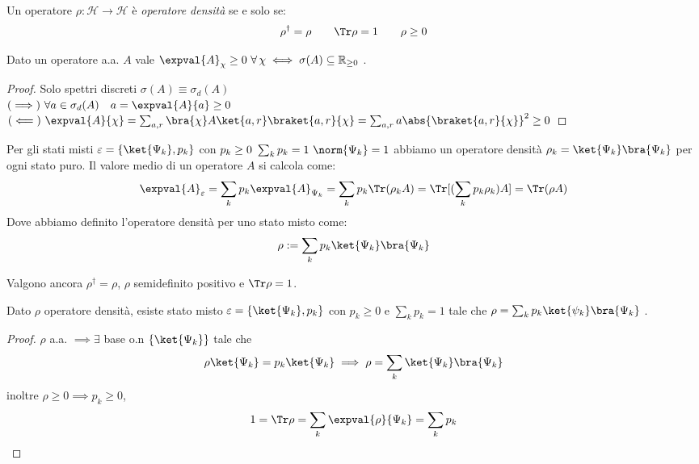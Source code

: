 \begin{definition}
    Un operatore \(\rho : \mathcal{H}\to \mathcal{H}\) è \textit{operatore densità} se e solo se:
    \begin{equation}
        \rho^\dagger = \rho \qquad \Tr \rho = 1 \qquad \rho \geq 0
    \end{equation}
\end{definition}

\begin{remark}
    Dato un operatore a.a. \(A\) vale \(\expval{A}_\chi\geq 0 \ \forall \, \chi \iff \sigma(A) \subseteq \mathbb{R}_{\geq0}\) .
\end{remark}
\begin{proof} Solo spettri discreti \(\sigma(A)\equiv \sigma_d(A)\)\\
    \((\implies) \ \forall a \in \sigma_d(A) \quad a = \expval{A}{a}\geq 0\)\\
    \((\impliedby) \ \expval{A}{\chi} = \sum_{a,r}\bra{\chi}A\ket{a,r}\braket{a,r}{\chi}= \sum_{a,r}a \abs{\braket{a,r}{\chi}}^2\geq 0\)
\end{proof}

Per gli stati misti \( \varepsilon = \left\{ \ket{\Psi_k}, p_k \right\}\) con \(p_k \geq0  \ \sum_k p_k= 1 \ \norm{\Psi_k}= 1\) abbiamo un operatore densità \(\rho_k = \ket{\Psi_k}\bra{\Psi_k}\) per ogni stato puro.
Il valore medio di un operatore \(A\) si calcola come:
\begin{equation}
    \expval{A}_\varepsilon = \sum_k p_k \expval{A}_{\Psi_k} = \sum_k  p_k \Tr(\rho_k A)= \Tr[(\sum_k p_k\rho_k)A] = \Tr(\rho A)
\end{equation}
Dove abbiamo definito l'operatore densità per uno stato misto come:
\begin{equation}
    \rho : = \sum_k  p_k\ket{\Psi_k}\bra{\Psi_k}    
\end{equation}

Valgono ancora \(\rho^\dagger = \rho\), \(\rho\) semidefinito positivo e \(\Tr \rho = 1\).

\begin{theorem}
    Dato \(\rho\) operatore densità, esiste stato misto \(\varepsilon = \left\{ \ket{\Psi_k}, p_k \right\}\) con \(p_k \geq 0 \) e \(\sum_k p_k =1\) tale che 
    \(\rho = \sum_k p_k \ket{\psi_k}\bra{\Psi_k}\) .
\end{theorem}
\begin{proof}
    \(\rho\) a.a. \(\implies  \exists\) base o.n \(\left\{\ket{\Psi_k}\right\}\) tale che 
    \[\rho\ket{\Psi_k}= p_k\ket{\Psi_k} \implies \rho = \sum_k \ket{\Psi_k}\bra{\Psi_k}\]
    inoltre \(\rho\geq0 \implies p_k \geq 0\),
    \[
        1 = \Tr \rho = \sum_k \expval{\rho}{\Psi_k} = \sum_k    p_k
    \]
    
\end{proof}


